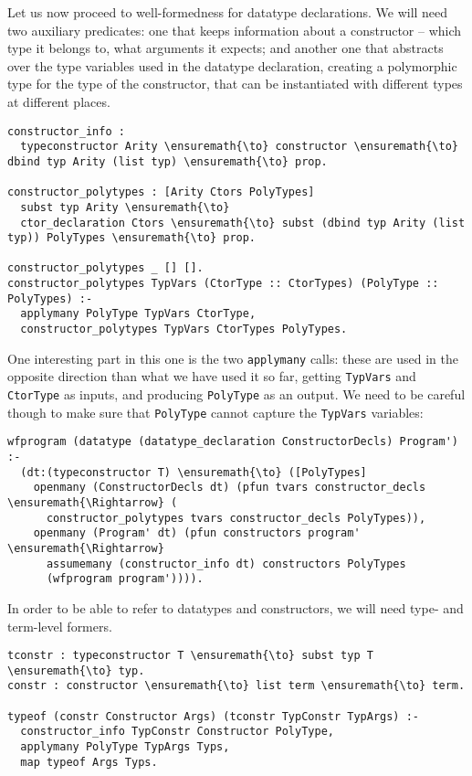 Let us now proceed to well-formedness for datatype declarations. We will
need two auxiliary predicates: one that keeps information about a
constructor -- which type it belongs to, what arguments it expects; and
another one that abstracts over the type variables used in the datatype
declaration, creating a polymorphic type for the type of the
constructor, that can be instantiated with different types at different
places.

\begin{verbatim}
constructor_info :
  typeconstructor Arity \ensuremath{\to} constructor \ensuremath{\to} dbind typ Arity (list typ) \ensuremath{\to} prop.

constructor_polytypes : [Arity Ctors PolyTypes]
  subst typ Arity \ensuremath{\to}
  ctor_declaration Ctors \ensuremath{\to} subst (dbind typ Arity (list typ)) PolyTypes \ensuremath{\to} prop.

constructor_polytypes _ [] [].
constructor_polytypes TypVars (CtorType :: CtorTypes) (PolyType :: PolyTypes) :-
  applymany PolyType TypVars CtorType,
  constructor_polytypes TypVars CtorTypes PolyTypes.
\end{verbatim}

One interesting part in this one is the two \texttt{applymany} calls:
these are used in the opposite direction than what we have used it so
far, getting \texttt{TypVars} and \texttt{CtorType} as inputs, and
producing \texttt{PolyType} as an output. We need to be careful though
to make sure that \texttt{PolyType} cannot capture the \texttt{TypVars}
variables:

\begin{verbatim}
wfprogram (datatype (datatype_declaration ConstructorDecls) Program') :-
  (dt:(typeconstructor T) \ensuremath{\to} ([PolyTypes]
    openmany (ConstructorDecls dt) (pfun tvars constructor_decls \ensuremath{\Rightarrow} (
      constructor_polytypes tvars constructor_decls PolyTypes)),
    openmany (Program' dt) (pfun constructors program' \ensuremath{\Rightarrow}
      assumemany (constructor_info dt) constructors PolyTypes
      (wfprogram program')))).
\end{verbatim}

In order to be able to refer to datatypes and constructors, we will need
type- and term-level formers.

\begin{verbatim}
tconstr : typeconstructor T \ensuremath{\to} subst typ T \ensuremath{\to} typ.
constr : constructor \ensuremath{\to} list term \ensuremath{\to} term.

typeof (constr Constructor Args) (tconstr TypConstr TypArgs) :-
  constructor_info TypConstr Constructor PolyType,
  applymany PolyType TypArgs Typs,
  map typeof Args Typs.
\end{verbatim}

